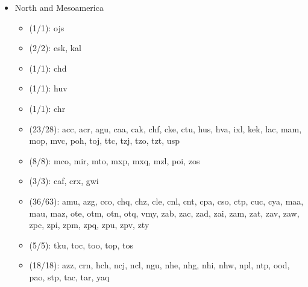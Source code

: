 \begin{itemize}[label={},leftmargin=0cm,labelindent=5pt,itemindent=0pt]
    \newpage 
  \item North and Mesoamerica
    \begin{itemize}[label={},leftmargin=!,labelindent=5pt,itemindent=-15pt]
  	\item {} (1/1): ojs
  	\item {} (2/2): esk, kal
  	\item {} (1/1): chd
  	\item {} (1/1): huv
  	\item {} (1/1): chr
  	\item {} (23/28): acc, acr, agu, caa, cak, chf, cke, ctu, hus, hva, ixl, kek, lac, mam, mop, mvc, poh, toj, ttc, tzj, tzo, tzt, usp
  	\item {} (8/8): mco, mir, mto, mxp, mxq, mzl, poi, zos
  	\item {} (3/3): caf, crx, gwi
  	\item {} (36/63): amu, azg, cco, chq, chz, cle, cnl, cnt, cpa, cso, ctp, cuc, cya, maa, mau, maz, ote, otm, otn, otq, vmy, zab, zac, zad, zai, zam, zat, zav, zaw, zpc, zpi, zpm, zpq, zpu, zpv, zty
  	\item {} (5/5): tku, toc, too, top, tos
  	\item {} (18/18): azz, crn, hch, ncj, ncl, ngu, nhe, nhg, nhi, nhw, npl, ntp, ood, pao, stp, tac, tar, yaq
    \end{itemize}


\end{itemize}
